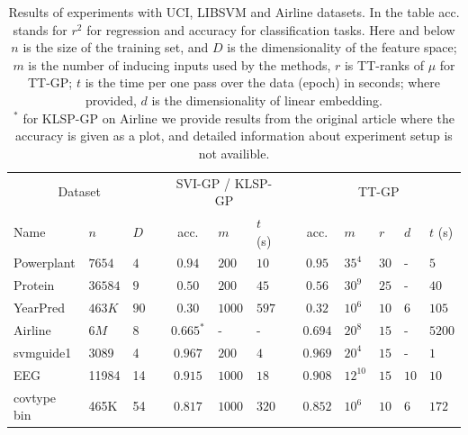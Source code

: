 \begin{table}[t]
  \caption[]{Results of experiments with UCI, LIBSVM and Airline datasets.
          In the table acc. stands for $r^2$ for regression and accuracy
          for classification tasks. Here and below $n$ is the size of the 
          training set, and $D$ is the dimensionality of the feature space;
          $m$ is the number of inducing inputs used by the methods, $r$ is
          TT-ranks of $\mu$ for TT-GP; $t$ is the time per one pass over
          the data (epoch) in seconds; where provided, $d$ is the dimensionality
          of linear embedding.\\
          $^*$ for KLSP-GP on Airline we provide results from the original 
          article where the accuracy is given as a plot, and detailed
          information about experiment setup is not availible.
          }
  \label{se_results}
  \centering
  \begin{tabular}{lll l cll l cllll}
    \toprule
    \multicolumn{3}{c}{Dataset} && \multicolumn{3}{c}{SVI-GP / KLSP-GP} && \multicolumn{5}{c}{TT-GP} \\
    \cmidrule{1-3}
    \cmidrule{5-7}
    \cmidrule{9-13}
    
    Name & $n$ & $D$ &&
    acc. & $m$ & $t$ (s) &&
    acc. & $m$ & $r$ & $d$ & $t$ (s)\\
    \midrule

    Powerplant & $7654$ & $4$ && 
    $0.94$ & $200$ & $10$ &&
    $0.95$ & $35^4$ & $30$ & - & $5$ \\

    Protein & $36584$ & $9$ && 
    $0.50$ & $200$ & $45$ &&
    $0.56$ & $30^9$ & $25$ & - & $40$ \\
    
    YearPred & $463K$ & $90$ && 
    $0.30$ & $1000$ & $597$ &&
    $0.32$ & $10^6$ & $10$ & $6$ & $105$ \\

    \midrule 
    Airline & $6M$ & $8$ && 
    $0.665^*$ & - & - &&
    $0.694$ & $20^8$ & $15$ & - & $5200$ \\

    svmguide1 & 3089 & 4 &&
    $0.967$ & $200$ & $4$ &&
    $0.969$ & $20^4$ & $15$ & - & $1$\\

    EEG & 11984 & 14 && 
    $0.915$ & $1000$ & $18$ &&
    $0.908$ & $12^{10}$ & $15$ & $10$ & $10$\\

    covtype bin & 465K & 54 && 
    $0.817$ & $1000$ & $320$ &&
    $0.852$ & $10^6$ & $10$ & $6$ & $172$\\
    \bottomrule
  \end{tabular}
\end{table}

